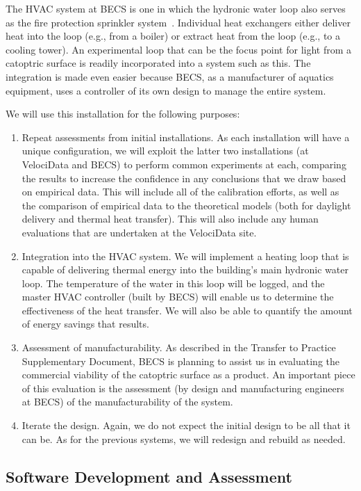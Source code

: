The HVAC system at BECS is one in which the hydronic water loop
also serves as the fire protection sprinkler system~\cite{Janus01,wm79}.
Individual heat exchangers either deliver heat into the loop 
(e.g., from a boiler) or extract heat from the loop (e.g., to a
cooling tower).
An experimental loop that can be the focus point for light from
a catoptric surface is readily incorporated into a system such
as this.  The integration is made even easier because BECS, as
a manufacturer of aquatics equipment, uses a controller of its own
design to manage the entire system.

We will use this installation for the following purposes:

\begin{enumerate}

\item Repeat assessments from initial installations.
As each installation will have a unique configuration, we will exploit the
latter two installations (at VelociData and BECS) to perform common
experiments at each, comparing the results to increase the confidence
in any conclusions that we draw based on empirical data.
This will include all of the calibration efforts, as well as the comparison
of empirical data to the theoretical models (both for daylight delivery
and thermal heat transfer).
This will also include any human evaluations that are undertaken at
the VelociData site.

\item Integration into the HVAC system.
We will implement a heating loop that is capable of delivering
thermal energy into the building's main hydronic water loop.
The temperature of the water in this loop will be logged, and the
master HVAC controller (built by BECS) will enable us to determine
the effectiveness of the heat transfer.  We will also be able to
quantify the amount of energy savings that results.

\item Assessment of manufacturability.
As described in the Transfer to Practice Supplementary Document, BECS
is planning to assist us in evaluating the commercial viability of the
catoptric surface as a product.  An important piece of this evaluation is
the assessment (by design and manufacturing engineers at BECS) of the
manufacturability of the system.

\item Iterate the design. Again, we do not expect the initial design
to be all that it can be. As for the previous systems, we will redesign
and rebuild as needed.

\end{enumerate}

\subsection{Software Development and Assessment}

